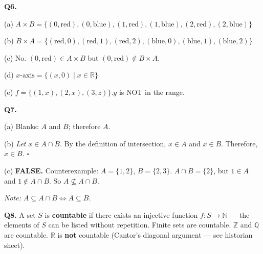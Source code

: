 \documentclass[12pt]{article}
\begin{document}
\bigskip
\textbf{Q6.}

(a)\; $A \times B = \{(0,\text{red}),(0,\text{blue}),(1,\text{red}),(1,\text{blue}),(2,\text{red}),(2,\text{blue})\}$

(b)\; $B \times A = \{(\text{red},0),(\text{red},1),(\text{red},2),(\text{blue},0),(\text{blue},1),(\text{blue},2)\}$

(c)\; No. $(0,\text{red}) \in A \times B$ but $(0,\text{red}) \notin B \times A$.

(d)\; $x\text{-axis} = \{(x,0) \mid x \in \mathbb{R}\}$

(e)\; $f = \{(1,x),(2,x),(3,z)\}$.\quad $y$ is NOT in the range.

\bigskip
\textbf{Q7.}

(a)\; Blanks: $A$ and $B$; therefore $A$.

(b)\; \textit{Let} $x \in A \cap B$.
By the definition of intersection, $x \in A$ and $x \in B$.
Therefore, $x \in B$. $\square$

(c)\; \textbf{FALSE.} Counterexample: $A = \{1,2\}$, $B = \{2,3\}$.
$A \cap B = \{2\}$, but $1 \in A$ and $1 \notin A \cap B$.
So $A \not\subseteq A \cap B$.

\textit{Note: $A \subseteq A \cap B \iff A \subseteq B$.}

\bigskip
\textbf{Q8.}\; A set $S$ is \textbf{countable} if there exists an injective function
$f\colon S \to \mathbb{N}$ --- the elements of $S$ can be listed without repetition.
Finite sets are countable. $\mathbb{Z}$ and $\mathbb{Q}$ are countable.
$\mathbb{R}$ is \textbf{not} countable (Cantor's diagonal argument --- see historian sheet).
\end{document}
